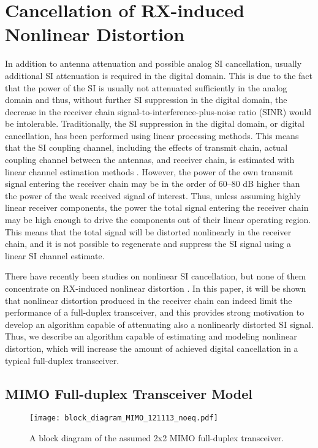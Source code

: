 \documentclass[conference,twoside,letterpaper,10pt]{IEEEtran}
\begin{document}
\section{Cancellation of RX-induced Nonlinear Distortion}
\label{sec:digital}
In addition to antenna attenuation and possible analog SI cancellation, usually additional SI attenuation is required in the digital domain. This is due to the fact that the power of the SI is usually not attenuated sufficiently in the analog domain and thus, without further SI suppression in the digital domain, the decrease in the receiver chain signal-to-interference-plus-noise ratio (SINR) would be intolerable. Traditionally, the SI suppression in the digital domain, or digital cancellation, has been performed using linear processing methods. This means that the SI coupling channel, including the effects of transmit chain, actual coupling channel between the antennas, and receiver chain, is estimated with linear channel estimation methods \cite{Choi10,Jain11,Duarte12,Sahai11}. However, the power of the own transmit signal entering the receiver chain may be in the order of 60--80 dB higher than the power of the weak received signal of interest. Thus, unless assuming highly linear receiver components, the power the total signal entering the receiver chain may be high enough to drive the components out of their linear operating region. This means that the total signal will be distorted nonlinearly in the receiver chain, and it is not possible to regenerate and suppress the SI signal using a linear SI channel estimate.

There have recently been studies on nonlinear SI cancellation, but none of them concentrate on RX-induced nonlinear distortion \cite{Anttila13,Ahmed13,Bharadia13}. In this paper, it will be shown that nonlinear distortion produced in the receiver chain can indeed limit the performance of a full-duplex transceiver, and this provides strong motivation to develop an algorithm capable of attenuating also a nonlinearly distorted SI signal. Thus, we describe an algorithm capable of estimating and modeling nonlinear distortion, which will increase the amount of achieved digital cancellation in a typical full-duplex transceiver.

\subsection{MIMO Full-duplex Transceiver Model}

\begin{figure*}[!t]
\centering
\texttt{[image: block\_diagram\_MIMO\_121113\_noeq.pdf]}
\caption{A block diagram of the assumed 2x2 MIMO full-duplex transceiver.}
\label{fig:block_diagram}
\end{figure*}
\end{document}

